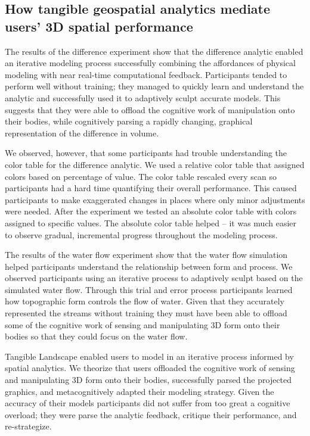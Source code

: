 \documentclass[prodmode,acmtochi]{acmsmall} %
\begin{document}
\subsection{How tangible geospatial analytics mediate users' 3D spatial performance} 
The results of the difference experiment show that 
the difference analytic 
enabled an iterative modeling process
successfully combining the affordances of physical modeling
with near real-time computational feedback. 
%
Participants tended to perform well without training; 
they managed to quickly learn and 
understand the analytic
and successfully used it to adaptively sculpt
accurate models.
%
This suggests that they were able to offload the cognitive work 
of manipulation onto their bodies, while cognitively 
parsing a rapidly changing, graphical representation 
of the difference in volume.

We observed, however, that some participants had trouble understanding
the color table for the difference analytic. 
We used a relative color table 
that assigned colors based on percentage of value.
The color table rescaled every scan 
so participants had a hard time quantifying their overall performance.
This caused participants to make exaggerated changes in places
where only minor adjustments were needed.
%
After the experiment we tested an absolute color table
with colors assigned to specific values.
The absolute color table helped -- it was much easier 
to observe gradual, incremental progress throughout the modeling process.

The results of the water flow experiment show 
that the water flow simulation helped participants 
understand the relationship between form and process.
We observed participants using an iterative process
to adaptively sculpt based on the simulated water flow. 
Through this trial and error process 
participants learned how
topographic form controls the flow of water.
%
Given that they accurately represented the streams without training
they must have been able to offload 
some of the cognitive work of sensing and manipulating 
3D form onto their bodies so that 
they could focus on the water flow. 

Tangible Landscape enabled users 
to model in an iterative process informed by spatial analytics.
We theorize that users offloaded the cognitive work 
of sensing and manipulating 3D form onto their bodies,
successfully parsed the projected graphics,
and metacognitively adapted their modeling strategy.
Given the accuracy of their models 
participants did not suffer from too great a cognitive overload;
they were parse the analytic feedback, critique their performance, and re-strategize.
\end{document}
